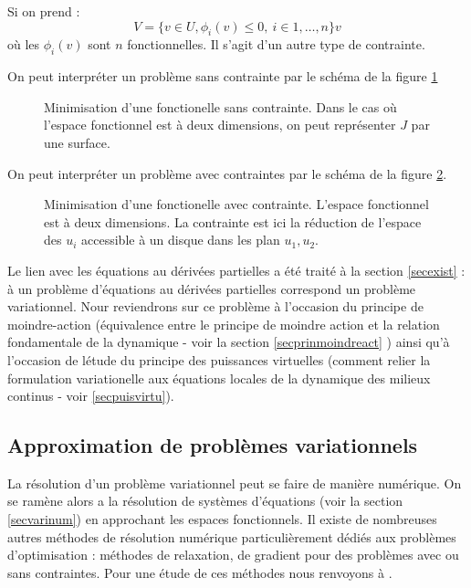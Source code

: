 \documentclass[12pt]{book}
\begin{document}
\begin{exmp}
Si on prend :
\begin{equation}
V=\{v\in U, \phi_{i}(v)\leq 0,\ i\in 1,\dots,n  \}
v\end{equation}
o\`u les $\phi_{i}(v)$ sont $n$ fonctionnelles.
Il s'agit d'un autre type de contrainte.
\end{exmp}
On peut interpr\'eter un probl\`eme sans contrainte par le sch\'ema
de la figure \ref{figcontraintesans}
\begin{figure}[htb]
 \centerline{}   
 \caption{Minimisation d'une fonctionelle sans contrainte. Dans le cas
o\`u l'espace fonctionnel est \`a deux dimensions, on peut
repr\'esenter $J$ par une surface.}
 \label{figcontraintesans}
\end{figure}
On peut interpr\'eter un probl\`eme avec
contraintes\cite{ma:equad:Ciarlet88} par le sch\'ema 
de la figure \ref{figcontrainteavec}.
\begin{figure}[htb]
 \centerline{}   
 \caption{Minimisation d'une fonctionelle avec contrainte. L'espace
fonctionnel est \`a deux dimensions. La contrainte est ici la
r\'eduction de l'espace des $u_i$ accessible \`a un disque dans les plan
$u_1,u_2$. }
 \label{figcontrainteavec}
\end{figure}


 Le lien avec les \'equations au d\'eriv\'ees partielles a
\'et\'e trait\'e \`a la section \ref{secexist} : \`a un probl\`eme
d'\'equations au 
d\'eriv\'ees partielles correspond un probl\`eme variationnel. 
Nour reviendrons sur ce probl\`eme \`a l'occasion du principe de
moindre-action (\'equivalence entre le principe de moindre action et la
relation fondamentale de la dynamique - voir la section
\ref{secprinmoindreact} ) ainsi qu'\`a
l'occasion de l\'etude du principe des
puissances virtuelles (comment relier la formulation variationelle aux
\'equations locales de la dynamique des milieux continus - voir
\ref{secpuisvirtu}).

\subsection{Approximation de probl\`emes variationnels}
La r\'esolution d'un probl\`eme variationnel peut se faire de mani\`ere
num\'erique. On se ram\`ene alors a la r\'esolution de syst\`emes
d'\'equations (voir la section \ref{secvarinum}) en approchant les espaces
fonctionnels. 
Il existe de nombreuses autres m\'ethodes de r\'esolution num\'erique
particuli\`erement d\'edi\'es aux
probl\`emes d'optimisation : m\'ethodes de relaxation,
de gradient pour des probl\`emes avec ou sans contraintes.
Pour une \'etude de ces m\'ethodes nous renvoyons \`a \cite{ma:equad:Ciarlet88}.
\end{document}
